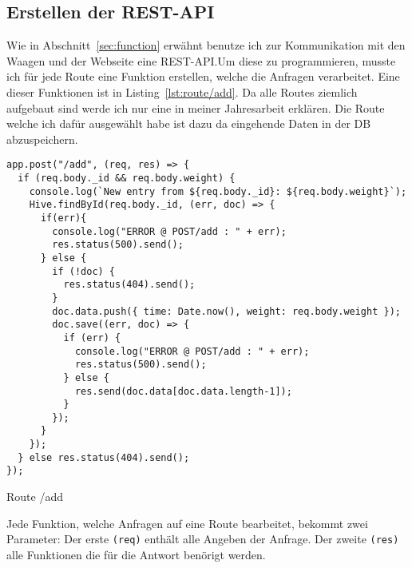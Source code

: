 \documentclass[a4paper, ngerman, 12pt]{scrartcl}
\newcommand{\js}[1]{\texttt{#1}}
\begin{document}
\subsection{Erstellen der REST-API} %

Wie in Abschnitt~\autoref{sec:function} erwähnt benutze ich zur Kommunikation mit den Waagen und der Webseite eine REST-API.\@ Um diese zu programmieren, musste ich für jede Route eine Funktion erstellen, welche die Anfragen verarbeitet. Eine dieser Funktionen ist in Listing~\ref{lst:route/add}. Da alle Routes ziemlich aufgebaut sind werde ich nur eine in meiner Jahresarbeit erklären. Die Route welche ich dafür ausgewählt habe ist dazu da eingehende Daten in der DB abzuspeichern. 
\begin{listing}[ht]
\begin{verbatim}
app.post("/add", (req, res) => {
  if (req.body._id && req.body.weight) {
    console.log(`New entry from ${req.body._id}: ${req.body.weight}`);
    Hive.findById(req.body._id, (err, doc) => {
      if(err){
        console.log("ERROR @ POST/add : " + err);
        res.status(500).send();
      } else {
        if (!doc) {
          res.status(404).send();
        }
        doc.data.push({ time: Date.now(), weight: req.body.weight });
        doc.save((err, doc) => {
          if (err) {
            console.log("ERROR @ POST/add : " + err);
            res.status(500).send();
          } else {
            res.send(doc.data[doc.data.length-1]);
          }
        });
      }
    });
  } else res.status(404).send();
});
\end{verbatim}
\caption{Route /add}\label{lst:route/add}
\end{listing}

Jede Funktion, welche Anfragen auf eine Route bearbeitet, bekommt zwei Parameter: Der erste \js{(req)} enthält alle Angeben der Anfrage. Der zweite \js{(res)} alle Funktionen die für die Antwort benörigt werden.
\end{document}
